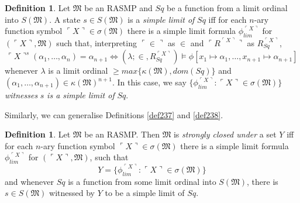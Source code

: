 \documentclass[12pt, twoside]{memoir}
\numberwithin{equation}{section}
\theoremstyle{definition}
\newtheorem{defi}[thm]{Definition}
\theoremstyle{remark}
\theoremstyle{definition}
\theoremstyle{definition}
\theoremstyle{definition}
\theoremstyle{remark}
\begin{document}
\begin{defi}\label{def256}
Let $\mathfrak{M}$ be an RASMP and $Sq$ be a function from a limit ordinal into $S(\mathfrak{M})$. A state $s \in S(\mathfrak{M})$ is a \emph{simple limit of} $Sq$ iff for each $n$-ary function symbol $\ulcorner X \urcorner \in \sigma(\mathfrak{M})$ there is a simple limit formula $\phi_{lim}^{\ulcorner X \urcorner}$ for $(\ulcorner X \urcorner, \mathfrak{M})$ such that, interpreting $\ulcorner \in \urcorner$ as $\in$ and $\ulcorner R^{\ulcorner X \urcorner} \urcorner$ as $R_{Sq}^{\ulcorner X \urcorner}$, 
\begin{equation*}
    \ulcorner X \urcorner^s (\alpha_1, \dots, \alpha_n) = \alpha_{n+1} \iff (\lambda; \in, R_{Sq}^{\ulcorner X \urcorner}) \models \phi[x_1 \mapsto \alpha_1, \dots, x_{n+1} \mapsto \alpha_{n+1}]
\end{equation*}
whenever $\lambda$ is a limit ordinal $\geq max\{\kappa(\mathfrak{M}), dom(Sq)\}$ and $(\alpha_1, \dots, \alpha_{n+1}) \in \kappa(\mathfrak{M})^{n+1}$. In this case, we say $\{\phi_{lim}^{\ulcorner X \urcorner} : \ulcorner X \urcorner \in \sigma(\mathfrak{M})\}$ \emph{witnesses} $s$ \emph{is a simple limit of} $Sq$.
\end{defi}

Similarly, we can generalise Definitions \ref{def237} and \ref{def238}.

\begin{defi}\label{def257p}
Let $\mathfrak{M}$ be an RASMP. Then $\mathfrak{M}$ is \emph{strongly closed under} a set $Y$ iff for each $n$-ary function symbol $\ulcorner X \urcorner \in \sigma(\mathfrak{M})$ there is a simple limit formula $\phi_{lim}^{\ulcorner X \urcorner}$ for $(\ulcorner X \urcorner, \mathfrak{M})$, such that 
\begin{equation*}
    Y = \{\phi_{lim}^{\ulcorner X \urcorner} : \ulcorner X \urcorner \in \sigma(\mathfrak{M})\}
\end{equation*}
and whenever $Sq$ is a function from some limit ordinal into $S(\mathfrak{M})$, there is $s \in S(\mathfrak{M})$ witnessed by $Y$ to be a simple limit of $Sq$.
\end{defi}
\end{document}
